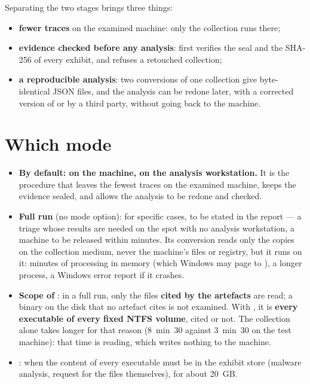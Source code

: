 \documentclass[11pt,a4paper,oneside]{report}
\begin{document}
Separating the two stages brings three things:
\begin{itemize}
  \item \textbf{fewer traces} on the examined machine: only the collection runs
        there;
  \item \textbf{evidence checked before any analysis}:  first
        verifies the seal and the SHA-256 of every exhibit, and refuses a
        retouched collection;
  \item \textbf{a reproducible analysis}: two conversions of one collection
        give byte-identical JSON files, and the analysis can be redone later,
        with a corrected version of \wac{} or by a third party, without going
        back to the machine.
\end{itemize}

\section{Which mode}

\begin{itemize}
  \item \textbf{By default:  on the machine,  on the
        analysis workstation.} It is the procedure that leaves the fewest traces
        on the examined machine, keeps the evidence sealed, and allows the
        analysis to be redone and checked.
  \item \textbf{Full run} (no mode option): for specific cases, to be stated in
        the report — a triage whose results are needed on the spot with no
        analysis workstation, a machine to be released within minutes. Its
        conversion reads only the copies on the collection medium, never the
        machine's files or registry, but it runs on it: minutes of processing
        in memory (which Windows may page to ), a longer
        process, a Windows error report if it crashes.
  \item \textbf{Scope of }: in a full run, only the files
        \textbf{cited by the artefacts} are read; a binary on the disk that no
        artefact cites is not examined. With , it is \textbf{every
        executable of every fixed NTFS volume}, cited or not. The collection
        alone takes longer for that reason (8~min~30 against 3~min~30 on the
        test machine): that time is reading, which writes nothing to the
        machine.
  \item \textbf{}: when the content of every executable must be
        in the exhibit store (malware analysis, request for the files
        themselves), for about 20~GB.
\end{itemize}
\end{document}
